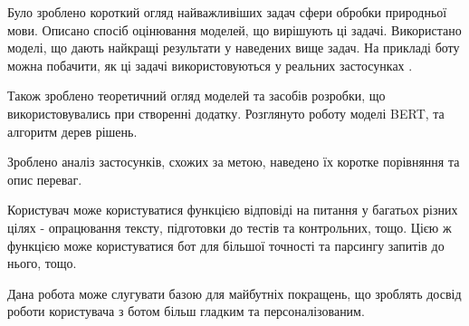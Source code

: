 Було зроблено короткий огляд найважливіших задач сфери обробки природньої мови. Описано спосіб оцінювання моделей, що вирішують ці задачі. Використано моделі, що дають найкращі результати у наведених вище задач. На прикладі боту можна побачити, як ці задачі використовуються у реальних застосунках . 

Також зроблено теоретичний огляд моделей та засобів розробки, що використовувались при створенні додатку. Розглянуто роботу моделі BERT, та алгоритм дерев рішень.

Зроблено аналіз застосунків, схожих за метою, наведено їх коротке порівняння та опис переваг.

Користувач може користуватися функцією відповіді на питання у багатьох різних цілях - опрацювання тексту, підготовки до тестів та контрольних, тощо. Цією ж функцією може користуватися бот для більшої точності  та парсингу запитів до нього, тощо.

Дана робота може слугувати базою для майбутніх покращень, що зроблять досвід роботи користувача з ботом більш гладким та персоналізованим.


